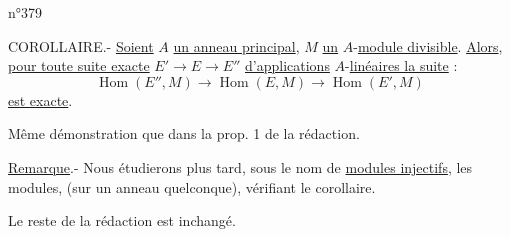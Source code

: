 \hfill n°379

COROLLAIRE.- \uline{Soient} $A$ \uline{un anneau principal}, $M$ \uline{un} $A$-\uline{module divisible}. \uline{Alors}, \uline{pour toute suite exacte} $E'\longrightarrow E\longrightarrow E''$ \uline{d'applications} $A$-\uline{linéaires la suite} :
\[
\operatorname{Hom}(E'',M)\longrightarrow\operatorname{Hom}(E,M)\longrightarrow\operatorname{Hom}(E',M)
\]
\uline{est exacte}.

Même démonstration que dans la prop. 1 de la rédaction.

\uline{Remarque}.- Nous étudierons plus tard, sous le nom de \uline{modules injectifs}, les modules, (sur un anneau quelconque), vérifiant le corollaire.

Le reste de la rédaction est inchangé.

\begin{center}\unsure{-:-:-:-}\end{center}
